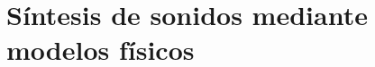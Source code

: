 \documentclass[assd_tp2_main.tex]{subfiles}
\begin{document}
\section{Síntesis de sonidos mediante modelos f\'isicos}
\end{document}
